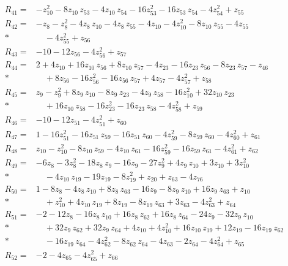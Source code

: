 \documentclass[11pt]{article}
\theoremstyle{remark}\newtheorem{remark}[theorem]{Remark}
\begin{document}
\begin{align*}
R_{41}={}& -z_{10}^{2} - 8z_{10}\,z_{53} - 4z_{10}\,z_{54} - 16z_{53}^{2} - 16z_{53}\,z_{54} - 4z_{54}^{2} + z_{55} \\[2pt]
R_{42}={}& -z_{8} - z_{8}^{2} - 4z_{8}\,z_{10} - 4z_{8}\,z_{55} - 4z_{10} - 4z_{10}^{2} - 8z_{10}\,z_{55} - 4z_{55} \\*
&\quad  - 4z_{55}^{2} + z_{56} \\[2pt]
R_{43}={}& -10 - 12z_{56} - 4z_{56}^{2} + z_{57} \\[2pt]
R_{44}={}& 2 + 4z_{10} + 16z_{10}\,z_{56} + 8z_{10}\,z_{57} - 4z_{23} - 16z_{23}\,z_{56} - 8z_{23}\,z_{57} - z_{46} \\*
&\quad  + 8z_{56} - 16z_{56}^{2} - 16z_{56}\,z_{57} + 4z_{57} - 4z_{57}^{2} + z_{58} \\[2pt]
R_{45}={}& z_{9} - z_{9}^{2} + 8z_{9}\,z_{10} - 8z_{9}\,z_{23} - 4z_{9}\,z_{58} - 16z_{10}^{2} + 32z_{10}\,z_{23} \\*
&\quad  + 16z_{10}\,z_{58} - 16z_{23}^{2} - 16z_{23}\,z_{58} - 4z_{58}^{2} + z_{59} \\[2pt]
R_{46}={}& -10 - 12z_{51} - 4z_{51}^{2} + z_{60} \\[2pt]
R_{47}={}& 1 - 16z_{51}^{2} - 16z_{51}\,z_{59} - 16z_{51}\,z_{60} - 4z_{59}^{2} - 8z_{59}\,z_{60} - 4z_{60}^{2} + z_{61} \\[2pt]
R_{48}={}& z_{10} - z_{10}^{2} - 8z_{10}\,z_{59} - 4z_{10}\,z_{61} - 16z_{59}^{2} - 16z_{59}\,z_{61} - 4z_{61}^{2} + z_{62} \\[2pt]
R_{49}={}& -6z_{8} - 3z_{8}^{2} - 18z_{8}\,z_{9} - 16z_{9} - 27z_{9}^{2} + 4z_{9}\,z_{10} + 3z_{10} + 3z_{10}^{2} \\*
&\quad  - 4z_{10}\,z_{19} - 19z_{19} - 8z_{19}^{2} + z_{20} + z_{63} - 4z_{76} \\[2pt]
R_{50}={}& 1 - 8z_{8} - 4z_{8}\,z_{10} + 8z_{8}\,z_{63} - 16z_{9} - 8z_{9}\,z_{10} + 16z_{9}\,z_{63} + z_{10} \\*
&\quad  + z_{10}^{2} + 4z_{10}\,z_{19} + 8z_{19} - 8z_{19}\,z_{63} + 3z_{63} - 4z_{63}^{2} + z_{64} \\[2pt]
R_{51}={}& -2 - 12z_{8} - 16z_{8}\,z_{10} + 16z_{8}\,z_{62} + 16z_{8}\,z_{64} - 24z_{9} - 32z_{9}\,z_{10} \\*
&\quad  + 32z_{9}\,z_{62} + 32z_{9}\,z_{64} + 4z_{10} + 4z_{10}^{2} + 16z_{10}\,z_{19} + 12z_{19} - 16z_{19}\,z_{62} \\*
&\quad  - 16z_{19}\,z_{64} - 4z_{62}^{2} - 8z_{62}\,z_{64} - 4z_{63} - 2z_{64} - 4z_{64}^{2} + z_{65} \\[2pt]
R_{52}={}& -2 - 4z_{65} - 4z_{65}^{2} + z_{66} \\[2pt]

\end{align*}
\end{document}
